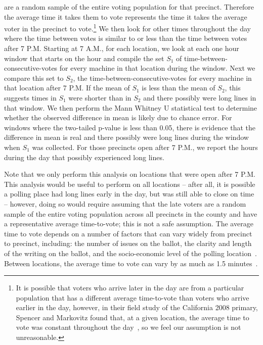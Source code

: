 \documentclass[letterpaper,twocolumn,10pt]{article}
\begin{document}
are a random sample of the entire voting population for that precinct. Therefore
the average time it takes them to vote represents the time it takes the average
voter in the precinct to vote.\footnote{It is possible that voters who arrive later in
the day are from a particular population that has a different average
time-to-vote than voters who arrive earlier in the day, however, in their field
study of the California 2008 primary, Spencer and Markovitz found that, at a
given location, the
average time to vote was constant throughout the day~\cite{Spencer2010}, so we
feel our assumption is not unreasonable.} We 
then look for other times throughout the day where the time between votes is
similar to or less than the time between votes after 7 P.M. Starting at 7 A.M.,
for each location, we look at each one hour window that starts on the hour and
compile the set $S_1$ of time-between-consecutive-votes for every machine in
that location during the window. Next we compare this set to $S_2$, the
time-between-consecutive-votes for every machine in that location after 7
P.M. If the mean of $S_1$ is less than the mean of $S_2$, this suggests times in
$S_1$ were shorter than in $S_2$ and there possibly were long lines in that
window. We then perform the Mann Whitney U statistical test to determine whether
the observed difference in mean is likely due to chance error. For windows where the
two-tailed p-value is less than 0.05, there is evidence that the difference in
mean is real and there possibly were long lines during the window when $S_1$ was
collected. For those precincts open after 7 P.M., we report the hours during the
day that possibly experienced long lines.

Note that we only perform this analysis on locations that were open
after 7 P.M. This analysis would be useful to perform on all locations
-- after all, it is possible a polling place had long lines early in the day, but
was still able to close on time -- however, doing so would require assuming that
the late voters are a random sample of the entire voting population across all
precincts in the county and have a representative average time-to-vote; this is
not a safe assumption. The average time to vote depends on a number of factors
that can vary widely from precinct to precinct, including: the number of issues
on the ballot, the clarity and length of the writing on the ballot, and the
socio-economic level of the polling location~\cite{Spencer2010,
  Allen2006}. Between locations, the average time to vote can vary by as much as
1.5 minutes~\cite{Spencer2010}.
\end{document}
